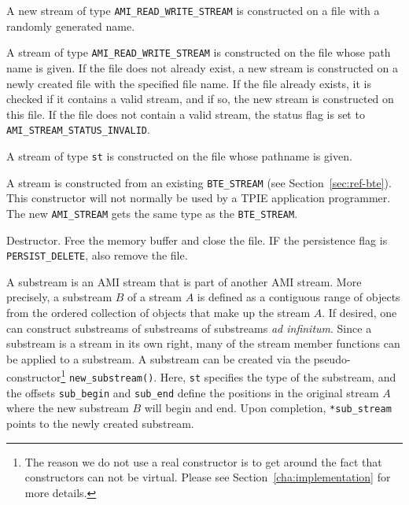    {A new stream of type
    \lstinline|AMI_READ_WRITE_STREAM| is constructed on a file with a
    randomly generated name.}
 
   {A stream of
    type \lstinline|AMI_READ_WRITE_STREAM| is constructed on the file
    whose path name is given. If the file does not already exist, a
    new stream is constructed on a newly created file with the
    specified file name. If the file already exists, it is checked if
    it contains a valid stream, and if so, the new stream is
    constructed on this file. If the file does not contain a valid
    stream, the status flag is set to
    \lstinline|AMI_STREAM_STATUS_INVALID|.}
  
   {A stream of type \lstinline|st| is
    constructed on the file whose pathname is given.}
  
   {A stream is
    constructed from an existing \lstinline|BTE_STREAM| (see
    Section~\ref{sec:ref-bte}). This constructor will not normally be
    used by a TPIE application programmer. The new
    \lstinline|AMI_STREAM| gets the same type as the
    \lstinline|BTE_STREAM|.}

     {Destructor. Free the memory
    buffer and close the file. IF the persistence flag is
    \lstinline|PERSIST_DELETE|, also remove the file.}
  
   {A
    substream is an AMI stream that is part of another AMI stream.
    More precisely, a substream $B$ of a stream $A$ is defined as a
    contiguous range of objects from the ordered collection of objects
    that make up the stream $A$.  If desired, one can construct
    substreams of substreams of substreams {\em ad infinitum}. Since a
    substream is a stream in its own right, many of the stream member
    functions can be applied to a substream. A substream can be
    created via the pseudo-constructor\footnote{The reason we do not
      use a real constructor is to get around the fact that
      constructors can not be virtual. Please see
      Section~\ref{cha:implementation} for more details.}
    \lstinline|new_substream()|. Here, \lstinline|st| specifies the
    type of the substream, and the offsets \lstinline|sub_begin| and
    \lstinline|sub_end| define the positions in the original stream
    $A$ where the new substream $B$ will begin and end. Upon
    completion, \lstinline|*sub_stream| points to the newly created
    substream.}

